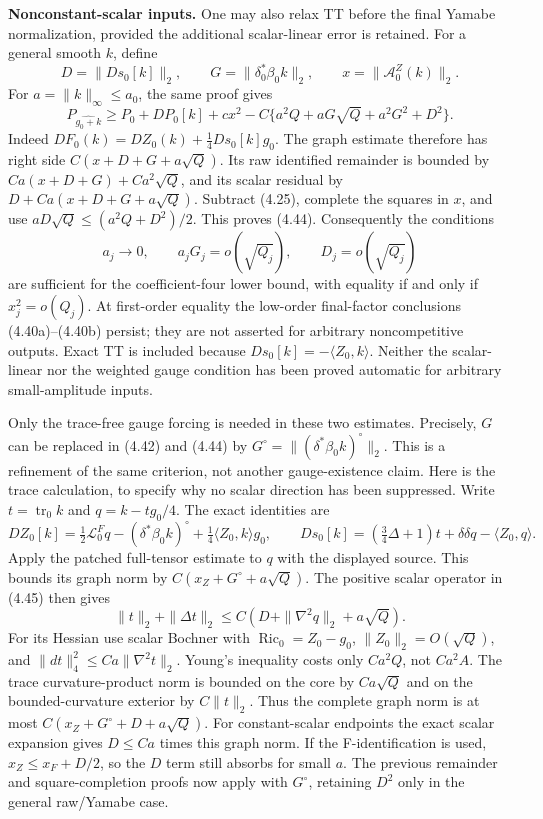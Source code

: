 \documentclass[
  10pt,
]{article}
\begin{document}
\textbf{Nonconstant-scalar inputs.} One may also relax TT before the
final Yamabe normalization, provided the additional scalar-linear error
is retained. For a general smooth \(k\), define \[
 D=\|Ds_0[k]\|_2,\qquad
 G=\|\delta_0^*\beta_0k\|_2,\qquad
 x=\|\mathcal A_0^Z(k)\|_2.
\] For \(a=\|k\|_\infty\le a_0\), the same proof gives \[
 \boxed{P_{\widehat{g_0+k}}\ge P_0+DP_0[k]+c x^2
       -C\{a^2Q+aG\sqrt Q+a^2G^2+D^2\}.} \tag{4.44}
\] Indeed \(DF_0(k)=DZ_0(k)+\frac14Ds_0[k]g_0\). The graph estimate
therefore has right side \(C(x+D+G+a\sqrt Q)\). Its raw identified
remainder is bounded by \(Ca(x+D+G)+Ca^2\sqrt Q\), and its scalar
residual by \(D+Ca(x+D+G+a\sqrt Q)\). Subtract (4.25), complete the
squares in \(x\), and use \(aD\sqrt Q\le(a^2Q+D^2)/2\). This proves
(4.44). Consequently the conditions \[
 a_j\to0,\qquad a_jG_j=o(\sqrt{Q_j}),\qquad
 D_j=o(\sqrt{Q_j})
\] are sufficient for the coefficient-four lower bound, with equality if
and only if \(x_j^2=o(Q_j)\). At first-order equality the low-order
final-factor conclusions (4.40a)--(4.40b) persist; they are not asserted
for arbitrary noncompetitive outputs. Exact TT is included because
\(Ds_0[k]=-\langle Z_0,k\rangle\). Neither the scalar-linear nor the
weighted gauge condition has been proved automatic for arbitrary
small-amplitude inputs.

Only the trace-free gauge forcing is needed in these two estimates.
Precisely, \(G\) can be replaced in (4.42) and (4.44) by
\(G^\circ=\|(\delta^*\beta_0k)^\circ\|_2\). This is a refinement of the
same criterion, not another gauge-existence claim. Here is the trace
calculation, to specify why no scalar direction has been suppressed.
Write \(t=\operatorname{tr}_0k\) and \(q=k-tg_0/4\). The exact
identities are \[
 DZ_0[k]=\tfrac12\mathcal L_0^Fq-(\delta^*\beta_0k)^\circ
                     +\tfrac14\langle Z_0,k\rangle g_0,
 \qquad
 Ds_0[k]=(\tfrac34\Delta+1)t+\delta\delta q-\langle Z_0,q\rangle.
 \tag{4.45}
\] Apply the patched full-tensor estimate to \(q\) with the displayed
source. This bounds its graph norm by \(C(x_Z+G^\circ+a\sqrt Q)\). The
positive scalar operator in (4.45) then gives \[
 \|t\|_2+\|\Delta t\|_2
       \le C(D+\|\nabla^2q\|_2+a\sqrt Q).
\] For its Hessian use scalar Bochner with
\(\operatorname{Ric}_0=Z_0-g_0\), \(\|Z_0\|_2=O(\sqrt Q)\), and
\(\|dt\|_4^2\le Ca\|\nabla^2t\|_2\). Young's inequality costs only
\(Ca^2Q\), not \(Ca^2A\). The trace curvature-product norm is bounded on
the core by \(Ca\sqrt Q\) and on the bounded-curvature exterior by
\(C\|t\|_2\). Thus the complete graph norm is at most
\(C(x_Z+G^\circ+D+a\sqrt Q)\). For constant-scalar endpoints the exact
scalar expansion gives \(D\le Ca\) times this graph norm. If the
F-identification is used, \(x_Z\le x_F+D/2\), so the \(D\) term still
absorbs for small \(a\). The previous remainder and square-completion
proofs now apply with \(G^\circ\), retaining \(D^2\) only in the general
raw/Yamabe case.
\end{document}
